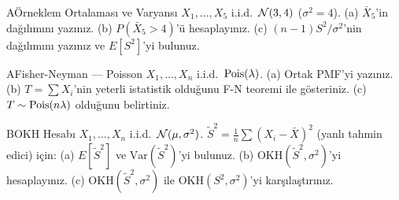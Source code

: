 
\cozumlualistirmalar

\begin{alistirma}[Al.11.1]{A}{Örneklem Ortalaması ve Varyansı}
$X_1,\ldots,X_5$ i.i.d.\ $\mathcal{N}(3, 4)$ ($\sigma^2=4$).
(a) $\bar{X}_5$'in dağılımını yazınız.
(b) $P(\bar{X}_5 > 4)$'ü hesaplayınız.
(c) $(n-1)S^2/\sigma^2$'nin dağılımını yazınız ve $E[S^2]$'yi bulunuz.
\end{alistirma}

\begin{alistirma}[Al.11.2]{A}{Fisher-Neyman --- Poisson}
$X_1,\ldots,X_n$ i.i.d.\ $\operatorname{Pois}(\lambda)$.
(a) Ortak PMF'yi yazınız. (b) $T = \sum X_i$'nin yeterli istatistik olduğunu F-N teoremi ile gösteriniz.
(c) $T \sim \operatorname{Pois}(n\lambda)$ olduğunu belirtiniz.
\end{alistirma}

\begin{alistirma}[Al.11.3]{B}{OKH Hesabı}
$X_1,\ldots,X_n$ i.i.d.\ $\mathcal{N}(\mu,\sigma^2)$.
$\tilde{S}^2 = \frac{1}{n}\sum(X_i-\bar{X})^2$ (yanlı tahmin edici) için:
(a) $E[\tilde{S}^2]$ ve $\mathrm{Var}(\tilde{S}^2)$'yi bulunuz.
(b) $\mathrm{OKH}(\tilde{S}^2, \sigma^2)$'yi hesaplayınız.
(c) $\mathrm{OKH}(\tilde{S}^2,\sigma^2)$ ile $\mathrm{OKH}(S^2,\sigma^2)$'yi karşılaştırınız.
\end{alistirma}

